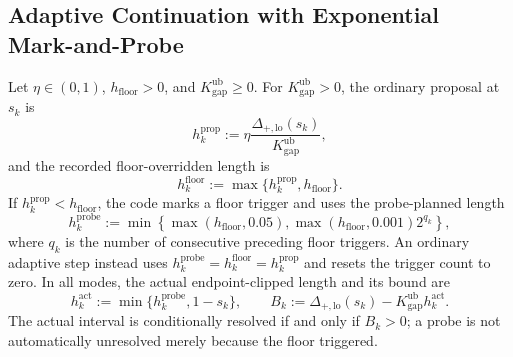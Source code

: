 \documentclass[11pt, a4paper]{article}
\begin{document}
\subsection{Adaptive Continuation with Exponential Mark-and-Probe}
Let $\eta\in(0,1)$, $h_{\mathrm{floor}}>0$, and $K_{\mathrm{gap}}^{\mathrm{ub}}\ge0$. For $K_{\mathrm{gap}}^{\mathrm{ub}}>0$, the ordinary proposal at $s_k$ is
\begin{equation}
h_k^{\mathrm{prop}}:=\eta\frac{\Delta_{+,\mathrm{lo}}(s_k)}{K_{\mathrm{gap}}^{\mathrm{ub}}},
\end{equation}
and the recorded floor-overridden length is
\begin{equation}
h_k^{\mathrm{floor}}:=\max\{h_k^{\mathrm{prop}},h_{\mathrm{floor}}\}.
\end{equation}
If $h_k^{\mathrm{prop}}<h_{\mathrm{floor}}$, the code marks a floor trigger and uses the probe-planned length
\begin{equation}
\label{eq:probe-plan}
h_k^{\mathrm{probe}}
:=\min\!\left\{\max(h_{\mathrm{floor}},0.05),
\max(h_{\mathrm{floor}},0.001)2^{q_k}\right\},
\end{equation}
where $q_k$ is the number of consecutive preceding floor triggers. An ordinary adaptive step instead uses $h_k^{\mathrm{probe}}=h_k^{\mathrm{floor}}=h_k^{\mathrm{prop}}$ and resets the trigger count to zero. In all modes, the actual endpoint-clipped length and its bound are
\begin{equation}
h_k^{\mathrm{act}}:=\min\{h_k^{\mathrm{probe}},1-s_k\},
\qquad
B_k:=\Delta_{+,\mathrm{lo}}(s_k)-K_{\mathrm{gap}}^{\mathrm{ub}}h_k^{\mathrm{act}}.
\end{equation}
The actual interval is conditionally resolved if and only if $B_k>0$; a probe is not automatically unresolved merely because the floor triggered.
\end{document}
